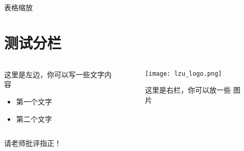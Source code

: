 \documentclass{ldr-simple-gray}
\begin{document}
\begin{frame}{表格缩放}
  \begin{table}[htbp]
    \centering
    \caption{不同决策树算法的特征选择标准}
  \end{table}%
\end{frame}

\section{测试分栏}

\begin{frame}
  \begin{columns}
      \begin{column}{0.4\textwidth}
        这里是左边，你可以写一些文字内容
        \begin{itemize}
          \item 第一个文字
          \item 第二个文字
        \end{itemize}
        
  \end{column}
  \begin{column}{0.6\textwidth}
      \begin{figure}[htbp!]
          \centering
          \texttt{[image: lzu\_logo.png]}
          \caption{这里是右栏，你可以放一些
          图片}
        \end{figure}
      \end{column}      
  \end{columns}
\end{frame}

\begin{frame}{\quad}
    \begin{center}
             请老师批评指正！
    \end{center}
\end{frame}

    
\end{document}
